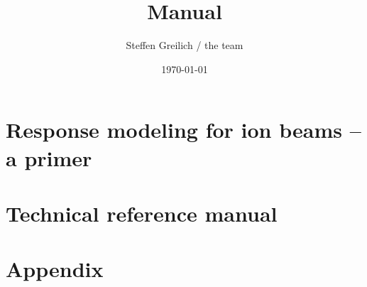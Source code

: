 \documentclass[10pt,a4paper]{book}
\title{\la{} Manual}
\author{Steffen Greilich / the \la{} team}
\date{\today}
\begin{document}
\maketitle

\tableofcontents



\part{Response modeling for ion beams -- a primer}







\part{Technical reference manual}









\part{Appendix}





\end{document}
